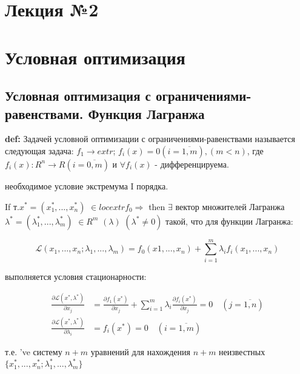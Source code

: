 \documentclass[a4paper]{article}
\begin{document}
\large
\section{Лекция №2}
\section*{Условная оптимизация}
\subsection*{Условная оптимизация с ограничениями-равенствами. Функция Лагранжа}

\textbf{def:} Задачей условной оптимизации с ограничениями-равенствами называется следующая задача: 
$f_1 \rightarrow extr$; $f_i(x)=0(i = \overline{1,m}),(m<n)$, где $f_i(x): R^n \rightarrow R(i = \overline{0,m})$ и $\forall f_i(x)$ - дифференцируема. \\

\begin{theorem}
необходимое условие экстремума I порядка.
\end{theorem}

If т.$x^* = (x^*_1,...,x^*_n)$ $\in locextr f_0 \Rightarrow$ then $\exists$ вектор множителей Лагранжа
$\lambda^* = (\lambda^*_1,...,\lambda^*_m)$ $\in R^m$ $(\lambda)$ $(\lambda^*\neq0)$ такой, что для функции Лагранжа:

\begin{equation}
\mathcal{L}(x_1,...,x_n;\lambda_1,...,\lambda_m) = f_0(x1,...,x_n) + \sum_{i=1}^{m} \lambda_i f_i(x_1,...,x_n)
\end{equation}

выполняется условия стационарности:

\begin{equation}
\begin{aligned}
\frac{\partial \mathcal{L}(x^*,\lambda^*)}{\partial x_j} &= \frac{\partial f_1(x^*)}{\partial x_j} + \sum_{i=1}^{m}\lambda_i \frac{\partial f_i(x^*)}{\partial x_j} = 0 \quad (j = \overline{1,n})
\\
\frac{\partial \mathcal{L}(x^*, \lambda^*)}{\partial \lambda_i} &= f_i(x^*) = 0 \quad (i = \overline{1,m})
\end{aligned}
\end{equation}

т.е. 've систему $n+m$ уравнений для нахождения $n+m$ неизвестных $\{x_1^*,...,x_n^*;\lambda_1^*,...,\lambda_m^*\}$ \\
\end{document}
